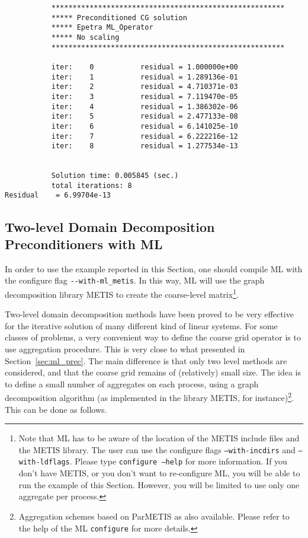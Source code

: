\begin{verbatim}
           *******************************************************
           ***** Preconditioned CG solution
           ***** Epetra ML_Operator
           ***** No scaling
           *******************************************************

           iter:    0           residual = 1.000000e+00
           iter:    1           residual = 1.289136e-01
           iter:    2           residual = 4.710371e-03
           iter:    3           residual = 7.119470e-05
           iter:    4           residual = 1.386302e-06
           iter:    5           residual = 2.477133e-08
           iter:    6           residual = 6.141025e-10
           iter:    7           residual = 6.222216e-12
           iter:    8           residual = 1.277534e-13


           Solution time: 0.005845 (sec.)
           total iterations: 8
Residual    = 6.99704e-13
\end{verbatim}



\subsection{Two-level Domain Decomposition Preconditioners with ML}
\label{sec:ml_DD}

In order to use the example reported in this Section, one should compile
ML with the configure flag \verb!--with-ml_metis!. In this way, ML will
use the graph decomposition library METIS to create the coarse-level
matrix\footnote{Note that ML has to be aware of the location of the
  METIS include files and the METIS library. The user can use the
  configure flags {\tt --with-incdirs} and {\tt --with-ldflags}.  Please
  type {\tt configure --help} for more information. If you don't have
  METIS, or you don't want to re-configure ML, you will be able to run
  the example of this Section. However, you will be limited to use only
  one aggregate per process.}.

Two-level domain decomposition methods have been proved to be very
effective for the iterative solution of many different kind of linear
systems.  For some classes of problems, a very convenient way to define
the coarse grid operator is to use aggregation procedure. This is very
close to what presented in Section~\ref{sec:ml_prec}. The main
difference is that only two level methods are considered, and that the
coarse grid remains of (relatively) small size. The idea is to define a
small number of aggregates on each process, using a graph decomposition
algorithm (as implemented in the library METIS, for
instance)\footnote{Aggregation schemes based on ParMETIS as also
  available. Please refer to the help of the ML {\tt configure} for more
  details.}. This can be done as follows.

